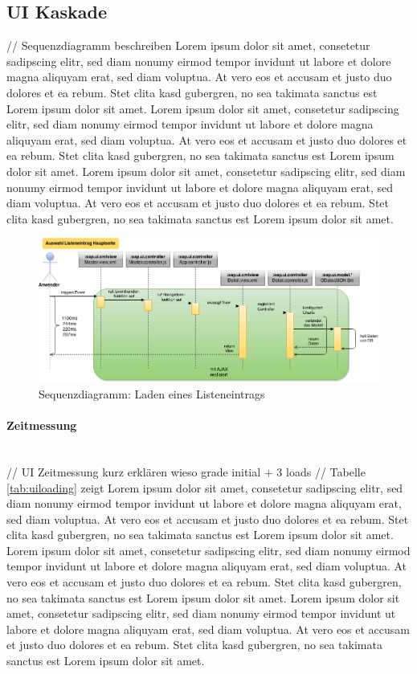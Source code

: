 \subsection{UI Kaskade}
// Sequenzdiagramm beschreiben
Lorem ipsum dolor sit amet, consetetur sadipscing elitr, sed diam nonumy eirmod tempor invidunt ut labore et dolore magna aliquyam erat, sed diam voluptua. At vero eos et accusam et justo duo dolores et ea rebum. Stet clita kasd gubergren, no sea takimata sanctus est Lorem ipsum dolor sit amet. Lorem ipsum dolor sit amet, consetetur sadipscing elitr, sed diam nonumy eirmod tempor invidunt ut labore et dolore magna aliquyam erat, sed diam voluptua. At vero eos et accusam et justo duo dolores et ea rebum. Stet clita kasd gubergren, no sea takimata sanctus est Lorem ipsum dolor sit amet. Lorem ipsum dolor sit amet, consetetur sadipscing elitr, sed diam nonumy eirmod tempor invidunt ut labore et dolore magna aliquyam erat, sed diam voluptua. At vero eos et accusam et justo duo dolores et ea rebum. Stet clita kasd gubergren, no sea takimata sanctus est Lorem ipsum dolor sit amet. 

\vspace{1em}
\begin{figure}[htb]
  \centering
  \includegraphics[width=0.95\linewidth,angle=90]{abb/sequence_load_list_entry}
  \caption[Sequenzdiagramm: Laden eines Listeneintrags]{Sequenzdiagramm: Laden eines Listeneintrags}
  \label{fig:sequenzdiagramm}
\end{figure}

\paragraph{Zeitmessung}$\;$ \\
// UI Zeitmessung kurz erklären wieso grade initial + 3 loads
// Tabelle \ref{tab:uiloading} zeigt
Lorem ipsum dolor sit amet, consetetur sadipscing elitr, sed diam nonumy eirmod tempor invidunt ut labore et dolore magna aliquyam erat, sed diam voluptua. At vero eos et accusam et justo duo dolores et ea rebum. Stet clita kasd gubergren, no sea takimata sanctus est Lorem ipsum dolor sit amet. Lorem ipsum dolor sit amet, consetetur sadipscing elitr, sed diam nonumy eirmod tempor invidunt ut labore et dolore magna aliquyam erat, sed diam voluptua. At vero eos et accusam et justo duo dolores et ea rebum. Stet clita kasd gubergren, no sea takimata sanctus est Lorem ipsum dolor sit amet. Lorem ipsum dolor sit amet, consetetur sadipscing elitr, sed diam nonumy eirmod tempor invidunt ut labore et dolore magna aliquyam erat, sed diam voluptua. At vero eos et accusam et justo duo dolores et ea rebum. Stet clita kasd gubergren, no sea takimata sanctus est Lorem ipsum dolor sit amet. 

